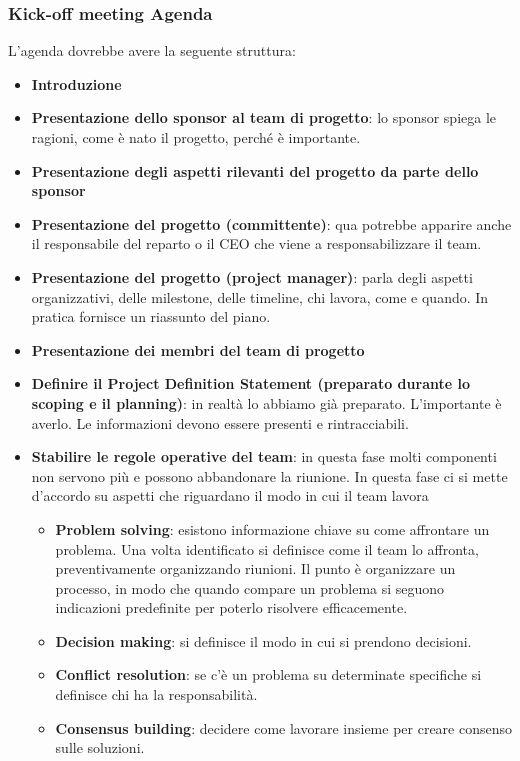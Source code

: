 \subsubsection{Kick-off meeting Agenda}
L’agenda dovrebbe avere la seguente struttura:
\begin{itemize}
	\item \textbf{Introduzione}
	\item \textbf{Presentazione dello sponsor al team di progetto}: lo sponsor spiega le ragioni, come è nato il progetto, perché è importante.
	\item \textbf{Presentazione degli aspetti rilevanti del progetto da parte dello sponsor}
	\item \textbf{Presentazione del progetto (committente)}: qua potrebbe apparire anche il responsabile del reparto o il CEO che viene a responsabilizzare il team.
	\item \textbf{Presentazione del progetto (project manager)}: parla degli aspetti organizzativi, delle milestone, delle timeline, chi lavora, come e quando. In pratica fornisce un riassunto del piano.
	\item \textbf{Presentazione dei membri del team di progetto}
	\item \textbf{Definire il Project Definition Statement (preparato durante lo scoping e il planning)}: in realtà lo abbiamo già preparato. L'importante è averlo. Le informazioni devono essere presenti e rintracciabili.
	\item \textbf{Stabilire le regole operative del team}: in questa fase molti componenti non servono più e possono abbandonare la riunione. In questa fase ci si mette d'accordo su aspetti che riguardano il modo in cui il team lavora
	\begin{itemize}
		\item \textbf{Problem solving}: esistono informazione chiave su come affrontare un problema. Una volta identificato si definisce come il team lo affronta, preventivamente organizzando riunioni. Il punto è organizzare un processo, in modo che quando compare un problema si seguono indicazioni predefinite per poterlo risolvere efficacemente.
		\item \textbf{Decision making}: si definisce il modo in cui si prendono decisioni.
		\item \textbf{Conflict resolution}: se c'è un problema su determinate specifiche si definisce chi ha la responsabilità.
		\item \textbf{Consensus building}: decidere come lavorare insieme per creare consenso sulle soluzioni.

\end{itemize}
\end{itemize}
